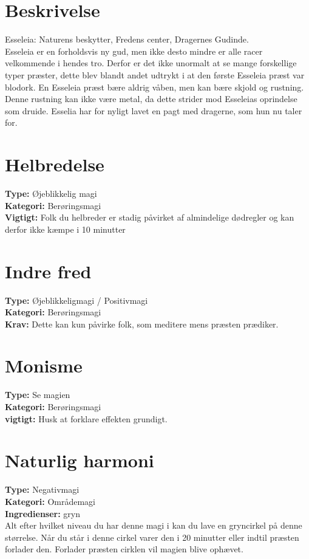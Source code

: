 \section*{Beskrivelse}
Esseleia: Naturens beskytter, Fredens center, Dragernes Gudinde.\\ Esseleia er en forholdsvis ny gud, men ikke desto mindre er alle racer velkommende i hendes tro. Derfor er det ikke unormalt at se mange forskellige typer præster, dette blev blandt andet udtrykt i at den første Esseleia præst var blodork. En Esseleia præst bære aldrig våben, men kan bære skjold og rustning. Denne rustning kan ikke være metal, da dette strider mod Esseleias oprindelse som druide. Esselia har for nyligt lavet en pagt med dragerne, som hun nu taler for.
\section*{Helbredelse}

\textbf{Type:} Øjeblikkelig magi \\
\textbf{Kategori:} Berøringsmagi\\
\textbf{Vigtigt:} Folk du helbreder er stadig påvirket af almindelige dødregler og kan derfor ikke kæmpe i 10 minutter

\section*{Indre fred}
\textbf{Type:} Øjeblikkeligmagi / Positivmagi\\
\textbf{Kategori:} Berøringsmagi\\
\textbf{Krav:} Dette kan kun påvirke folk, som meditere mens præsten prædiker.

\section*{Monisme}
\textbf{Type:} Se magien\\
\textbf{Kategori:} Berøringsmagi\\
\textbf{vigtigt:} Husk at forklare effekten grundigt.


\section*{Naturlig harmoni}
\textbf{Type:} Negativmagi\\
\textbf{Kategori:} Områdemagi\\
\textbf{Ingredienser:} gryn\\
Alt efter hvilket niveau du har denne magi i kan du lave en gryncirkel på denne størrelse. Når du står i denne cirkel varer den i 20 minutter eller indtil præsten forlader den. Forlader præsten cirklen vil magien blive ophævet.
